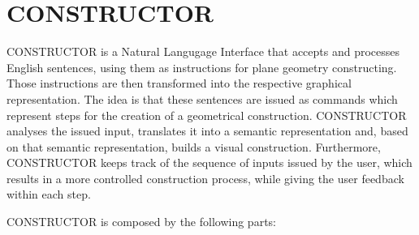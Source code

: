 \section{CONSTRUCTOR}
CONSTRUCTOR \cite{alexin_1990} is a Natural Langugage Interface that accepts and processes English sentences,
using them as instructions for plane geometry constructing.
Those instructions are then transformed into the respective graphical representation.
The idea is that these sentences are issued as commands which represent steps for the creation of a geometrical construction.
CONSTRUCTOR analyses the issued input, translates it into a semantic representation and, based on that semantic representation, builds a visual construction.
Furthermore, CONSTRUCTOR keeps track of the sequence of inputs issued by the user, which results in a more controlled construction process,
while giving the user feedback within each step.

\noindent CONSTRUCTOR is composed by the following parts:

